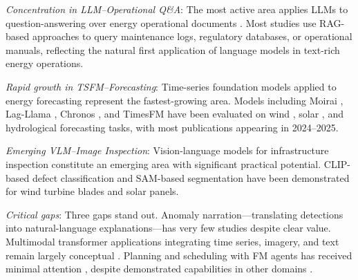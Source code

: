 \documentclass[preprint,12pt]{elsarticle}
\begin{document}
\textit{Concentration in LLM--Operational Q\&A}: The most active area applies LLMs to question-answering over energy operational documents \cite{ren2024watergpt, hu2025digital_twin_blade, jin2024chatgrid, hamann2024foundation_grid}. Most studies use RAG-based approaches to query maintenance logs, regulatory databases, or operational manuals, reflecting the natural first application of language models in text-rich energy operations.

\textit{Rapid growth in TSFM--Forecasting}: Time-series foundation models applied to energy forecasting represent the fastest-growing area. Models including Moirai \cite{woo2024moirai}, Lag-Llama \cite{rasul2023lagllama}, Chronos \cite{ansari2024chronos}, and TimesFM \cite{das2024timesfm} have been evaluated on wind \cite{lai2024bert4st, mo2024powerformer}, solar \cite{piantadosi2024tsfm_solar_forecast}, and hydrological \cite{liu2024transformer_hydrologic, zhang2024crossregion_streamflow} forecasting tasks, with most publications appearing in 2024--2025.

\textit{Emerging VLM--Image Inspection}: Vision-language models for infrastructure inspection constitute an emerging area with significant practical potential. CLIP-based defect classification \cite{zhou2024anomalyclip, memari2024blade_inspection_review} and SAM-based segmentation \cite{li2024sam_solar_panel, sheiati2024blade_identification} have been demonstrated for wind turbine blades and solar panels.

\textit{Critical gaps}: Three gaps stand out. Anomaly narration---translating detections into natural-language explanations---has very few studies \cite{ma2022hydro_turbine_anomaly, jalal2024dl_pv_faults} despite clear value. Multimodal transformer applications integrating time series, imagery, and text remain largely conceptual \cite{zaboli2025llm_power_security}. Planning and scheduling with FM agents has received minimal attention \cite{liu2025repower_llm_power}, despite demonstrated capabilities in other domains \cite{yao2023react, xi2023llmagent_survey}.
\end{document}
